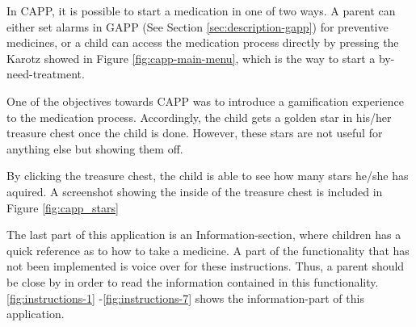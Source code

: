 In CAPP, it is possible to start a medication in one of two ways. A parent can either set alarms in GAPP (See Section \ref{sec:description-gapp}) for preventive medicines, or a child can access the medication process directly by pressing the Karotz showed in Figure \ref{fig:capp-main-menu}, which is the way to start a by-need-treatment. 


One of the objectives towards CAPP was to introduce a gamification experience to the medication process. Accordingly, the child gets a golden star in his/her treasure chest once the child is done. However, these stars are not useful for anything else but showing them off.
  

By clicking the treasure chest, the child is able to see how many stars he/she has aquired. A screenshot showing the inside of the treasure chest is included in Figure \ref{fig:capp_stars} 


The last part of this application is an Information-section, where children has a quick reference as to how to take a medicine. A part of the functionality that has not been implemented is voice over for these instructions. Thus, a parent should be close by in order to read the information contained in this functionality.     
\ref{fig:instructions-1} -\ref{fig:instructions-7} shows the information-part of this application.



